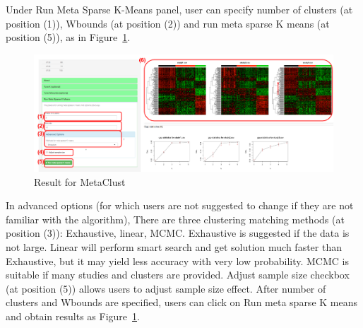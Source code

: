 \begin{steps}
Under Run Meta Sparse K-Means panel,
user can specify number of clusters (at position {\color{red} (1)}), Wbounds (at position {\color{red} (2)}) and run meta sparse K means (at position {\color{red} (5)}), 
as in Figure~\ref{fig:mskmRes}.
\begin{figure}[H]
\begin{center}
\includegraphics[scale=0.5]{./figure/metaClust/mskmRes.pdf}
\caption{Result for MetaClust}
\label{fig:mskmRes}
\end{center}
\end{figure}
In advanced options (for which users are not suggested to change if they are not familiar with the algorithm), 
There are three clustering matching methods (at position {\color{red} (3)}): Exhaustive, linear, MCMC.
Exhaustive is suggested if the data is not large.
Linear will perform smart search and get solution much faster than Exhaustive, 
but it may yield less accuracy with very low probability.
MCMC is suitable if many studies and clusters are provided.
Adjust sample size checkbox (at position {\color{red} (5)}) allows users to adjust sample size effect.
After number of clusters and Wbounds are specified,
users can click on Run meta sparse K means and obtain results as Figure~\ref{fig:mskmRes}.

\end{steps}

